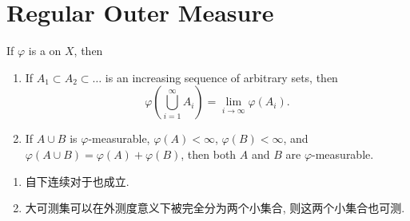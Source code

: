 \documentclass[../main.tex]{subfiles}
\begin{document}
\section{Regular Outer Measure}


\begin{theorem}{}{}
If $\varphi$ is a  on $X$, then
\begin{enumerate}
\item[(i)] If $A_1 \subset A_2 \subset \dots$ is an increasing sequence of arbitrary sets, then
\[
\varphi\left(\bigcup_{i=1}^{\infty} A_i\right) = \lim_{i\to\infty} \varphi(A_i).
\]
\item[(ii)] If $A \cup B$ is $\varphi$-measurable, $\varphi(A) < \infty$, $\varphi(B) < \infty$, and $\varphi(A \cup B) = \varphi(A) + \varphi(B)$, then both $A$ and $B$ are $\varphi$-measurable.
\end{enumerate}
\end{theorem}
\begin{note}
    \begin{enumerate}
        \item 自下连续对于也成立.
        \item 大可测集可以在外测度意义下被完全分为两个小集合, 则这两个小集合也可测.
    \end{enumerate}
    
\end{note}
\end{document}
